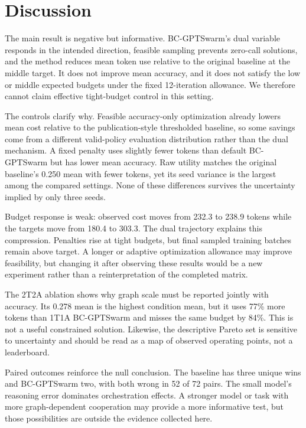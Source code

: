 \section{Discussion}

The main result is negative but informative. BC-GPTSwarm's dual variable responds in the intended direction, feasible sampling prevents zero-call solutions, and the method reduces mean token use relative to the original baseline at the middle target. It does not improve mean accuracy, and it does not satisfy the low or middle expected budgets under the fixed 12-iteration allowance. We therefore cannot claim effective tight-budget control in this setting.

The controls clarify why. Feasible accuracy-only optimization already lowers mean cost relative to the publication-style thresholded baseline, so some savings come from a different valid-policy evaluation distribution rather than the dual mechanism. A fixed penalty uses slightly fewer tokens than default BC-GPTSwarm but has lower mean accuracy. Raw utility matches the original baseline's 0.250 mean with fewer tokens, yet its seed variance is the largest among the compared settings. None of these differences survives the uncertainty implied by only three seeds.

Budget response is weak: observed cost moves from 232.3 to 238.9 tokens while the targets move from 180.4 to 303.3. The dual trajectory explains this compression. Penalties rise at tight budgets, but final sampled training batches remain above target. A longer or adaptive optimization allowance may improve feasibility, but changing it after observing these results would be a new experiment rather than a reinterpretation of the completed matrix.

The 2T2A ablation shows why graph scale must be reported jointly with accuracy. Its 0.278 mean is the highest condition mean, but it uses 77\% more tokens than 1T1A BC-GPTSwarm and misses the same budget by 84\%. This is not a useful constrained solution. Likewise, the descriptive Pareto set is sensitive to uncertainty and should be read as a map of observed operating points, not a leaderboard.

Paired outcomes reinforce the null conclusion. The baseline has three unique wins and BC-GPTSwarm two, with both wrong in 52 of 72 pairs. The small model's reasoning error dominates orchestration effects. A stronger model or task with more graph-dependent cooperation may provide a more informative test, but those possibilities are outside the evidence collected here.

